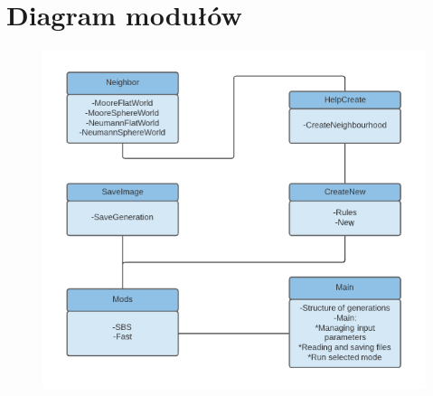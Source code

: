 \documentclass[a4paper]{article}
\begin{document}
\section{Diagram modu\l{}\'ow}
\begin{figure}[h]
	\centering
	\includegraphics{diagram}
\end{figure}
\end{document}

